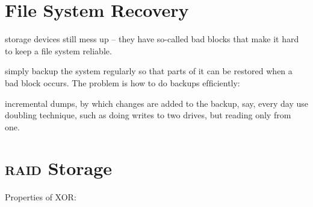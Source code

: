 \section{File System Recovery}

storage devices still mess up – they have
so-called bad blocks that make it hard to keep a ﬁle
system reliable.

simply backup the system regularly so that
parts of it can be restored when a bad block occurs.
The problem is how to do backups efﬁciently:

incremental dumps, by which changes are added
to the backup, say, every day
use doubling technique, such as doing writes to
two drives, but reading only from one.




\section{\textsc{raid} Storage}

Properties of XOR: